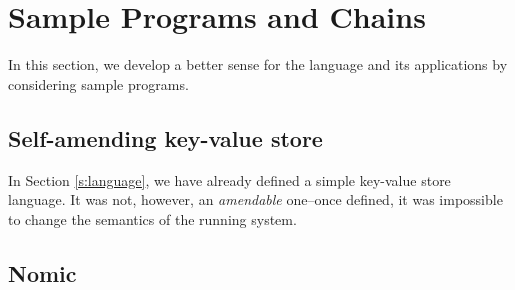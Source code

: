 \section{Sample Programs and Chains}

In this section, we develop a better sense for the language and its
applications by considering sample programs.

\subsection{Self-amending key-value store}

In Section \ref{s:language}, we have already defined a simple key-value store
language. It was not, however, an \textit{amendable} one--once defined, it was
impossible to change the semantics of the running system.



\subsection{Nomic}
\label{s:examples}
